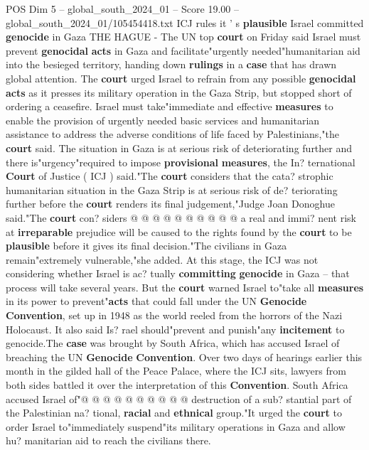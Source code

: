 \begin{textsample}{POS Dim 5 – global\_south\_2024\_01 – Score 19.00 – global\_south\_2024\_01/105454418.txt}  \label{ex:f5_pos_011}
ICJ rules it ' s \textbf{plausible} Israel committed \textbf{genocide} in Gaza THE HAGUE - The UN top \textbf{court} on Friday said Israel must prevent \textbf{genocidal} \textbf{acts} in Gaza and facilitate"urgently needed"humanitarian aid into the besieged territory, handing down \textbf{rulings} in a \textbf{case} that has drawn global attention.
The \textbf{court} urged Israel to refrain from any possible \textbf{genocidal} \textbf{acts} as it presses its military operation in the Gaza Strip, but stopped short of ordering a ceasefire.
Israel must take"immediate and effective \textbf{measures} to enable the provision of urgently needed basic services and humanitarian assistance to address the adverse conditions of life faced by Palestinians,"the \textbf{court} said.
The situation in Gaza is at serious risk of deteriorating further and there is"urgency"required to impose \textbf{provisional} \textbf{measures}, the In? ternational \textbf{Court} of Justice ( ICJ ) said."The \textbf{court} considers that the cata? strophic humanitarian situation in the Gaza Strip is at serious risk of de? teriorating further before the \textbf{court} renders its final judgement,"Judge Joan Donoghue said."The \textbf{court} con? siders @ @ @ @ @ @ @ @ @ @ a real and immi? nent risk at \textbf{irreparable} prejudice will be caused to the rights found by the \textbf{court} to be \textbf{plausible} before it gives its final decision."The civilians in Gaza remain"extremely vulnerable,"she added.
At this stage, the ICJ was not considering whether Israel is ac? tually \textbf{committing} \textbf{genocide} in Gaza -- that process will take several years.
But the \textbf{court} warned Israel to"take all \textbf{measures} in its power to prevent"\textbf{acts} that could fall under the UN \textbf{Genocide} \textbf{Convention}, set up in 1948 as the world reeled from the horrors of the Nazi Holocaust.
It also said Is? rael should"prevent and punish"any \textbf{incitement} to genocide.The \textbf{case} was brought by South Africa, which has accused Israel of breaching the UN \textbf{Genocide} \textbf{Convention}.
Over two days of hearings earlier this month in the gilded hall of the Peace Palace, where the ICJ sits, lawyers from both sides battled it over the interpretation of this \textbf{Convention}.
South Africa accused Israel of"@ @ @ @ @ @ @ @ @ @ destruction of a sub? stantial part of the Palestinian na? tional, \textbf{racial} and \textbf{ethnical} group."It urged the \textbf{court} to order Israel to"immediately suspend"its military operations in Gaza and allow hu? manitarian aid to reach the civilians there.

\end{textsample}
